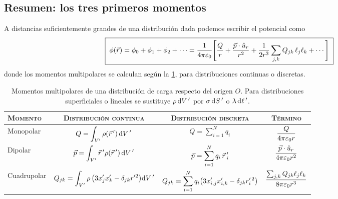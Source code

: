 

\subsection{Resumen: los tres primeros momentos}\label{sec:resumen}
A distancias suficientemente grandes de una distribución dada podemos escribir el potencial como
\begin{equation}\label{eq:resumen}
  \boxed{\;\phi(\vec{r})=\phi_{0}+\phi_{1}+\phi_{2}+\cdots=\frac{1}{4\pi\varepsilon_{0}}\Biggl[\frac{Q}{r}+\frac{\vec{p}\cdot\hat{u}_{r}}{r^{2}}+\frac{1}{2r^{3}}\sum_{j,k}Q_{jk}\,\ell_{j}\ell_{k}+\cdots\Biggr]\;}
\end{equation}
donde los momentos multipolares se calculan según la \cref{tab:momentos}, para distribuciones continuas o discretas.

\begin{table}[ht]
\centering
\caption{Momentos multipolares de una distribución de carga respecto del origen $O$. Para distribuciones superficiales o lineales se sustituye $\rho\,\mathrm{d} V\,'$ por
$\sigma\,\mathrm{d} S\,'$ o $\lambda\,\mathrm{d} \ell\,'$.}
\label{tab:momentos}
\renewcommand{\arraystretch}{1.7}
\small\setlength{\tabcolsep}{4pt}
\begin{tabular}{@{}lccc@{}}
  \toprule
  \textsc{Momento} & \textsc{Distribución continua} & \textsc{Distribución discreta} & \textsc{Término}\\
  \midrule
  Monopolar   & $Q=\displaystyle\int_{V'}\rho(\vec{r}\,')\,\mathrm{d} V\,'$ & $Q=\displaystyle\sum_{i=1}^{N}q_i$ & $\dfrac{Q}{4\pi\varepsilon_{0} r}$\\
  Dipolar     & $\vec{p}=\displaystyle\int_{V'}\vec{r}\,'\rho(\vec{r}\,')\,\mathrm{d} V\,'$ & $\vec{p}=\displaystyle\sum_{i=1}^{N}q_i\,\vec{r}\,'_i$ & $\dfrac{\vec{p}\cdot\hat{u}_{r}}{4\pi\varepsilon_{0} r^{2}}$\\
  Cuadrupolar & $Q_{jk}=\displaystyle\int_{V'}\rho\,\bigl(3x'_jx'_k-\delta_{jk}r'^{2}\bigr)\mathrm{d} V\,'$ & $Q_{jk}=\displaystyle\sum_{i=1}^{N}q_i\bigl(3x'_{i,j}x'_{i,k}-\delta_{jk}r_i'^{\,2}\bigr)$
                         & $\dfrac{\sum_{j,k}Q_{jk}\ell_{j}\ell_{k}}{8\pi\varepsilon_{0} r^{3}}$\\
  \bottomrule
\end{tabular}
\end{table}
